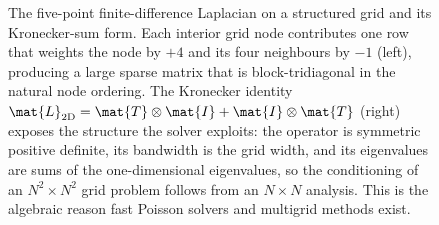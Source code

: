 \begin{figure}[ht]
\begin{tikzpicture}[x=1.0cm, y=1.0cm, font=\small]
\end{tikzpicture}
\caption[The discrete Poisson operator and its Kronecker structure]{The
five-point finite-difference Laplacian on a structured grid and its
Kronecker-sum form. Each interior grid node contributes one row that
weights the node by $+4$ and its four neighbours by $-1$ (left),
producing a large sparse matrix that is block-tridiagonal in the natural
node ordering. The Kronecker identity $\mat{L}_{2\mathrm{D}} = \mat{T}
\otimes \mat{I} + \mat{I} \otimes \mat{T}$ (right) exposes the structure
the solver exploits: the operator is symmetric positive definite, its
bandwidth is the grid width, and its eigenvalues are sums of the
one-dimensional eigenvalues, so the conditioning of an $N^{2} \times
N^{2}$ grid problem follows from an $N \times N$ analysis. This is the
algebraic reason fast Poisson solvers and multigrid methods exist.}
\label{fig:vol02:ch09:poisson-stencil}
\end{figure}
